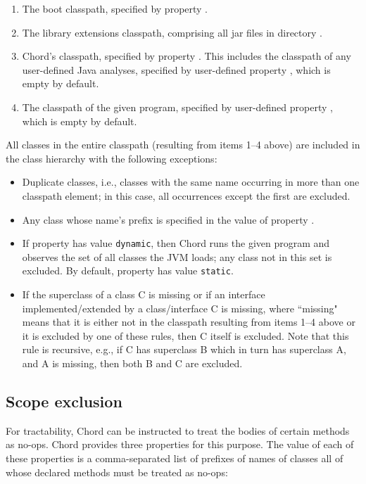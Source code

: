 \begin{enumerate}
\item
The boot classpath, specified by property .
\item
The library extensions classpath, comprising all jar files in
directory .
\item
Chord's classpath, specified by property
.  This includes the classpath of any
user-defined Java analyses, specified by user-defined property
, which is empty by default.
\item
The classpath of the given program, specified by user-defined property
, which is empty by default.
\end{enumerate}

All classes in the entire classpath (resulting from items 1--4 above)
are included in the class hierarchy with the following exceptions:
\begin{itemize}
\item
Duplicate classes, i.e., classes with the same name occurring in more
than one classpath element; in this case, all occurrences except the
first are excluded.
\item
Any class whose name's prefix is specified in the value of property
.
\item
If property  has value {\tt dynamic}, then
Chord runs the given program and observes the set of all classes the
JVM loads; any class not in this set is excluded.  By default,
property  has value {\tt static}.
\item
If the superclass of a class C is missing or if an interface
implemented/extended by a class/interface C is missing, where
``missing" means that it is either not in the classpath resulting from
items 1--4 above or it is excluded by one of these rules, then C
itself is excluded.  Note that this rule is recursive, e.g., if C has
superclass B which in turn has superclass A, and A is missing, then
both B and C are excluded.
\end{itemize}

\subsection{Scope exclusion}

For tractability, Chord can be instructed to treat the bodies of certain
methods as no-ops.  Chord provides three properties for this purpose.
The value of each of these properties is a comma-separated list of prefixes
of names of classes all of whose declared methods must be treated as no-ops:

